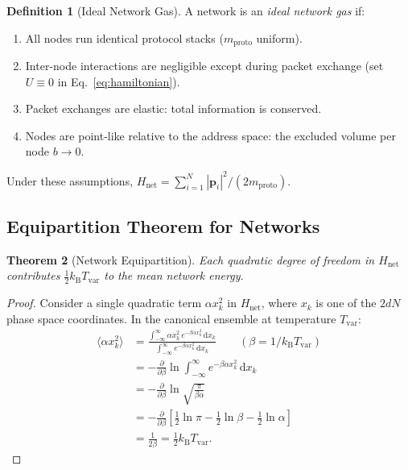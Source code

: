 \documentclass[11pt,twocolumn,a4paper]{article}
\newtheorem{theorem}{Theorem}[section]
\theoremstyle{definition}
\newtheorem{definition}[theorem]{Definition}
\theoremstyle{remark}
\newcommand{\kB}{k_{\mathrm{B}}}
\newcommand{\Tvar}{T_{\mathrm{var}}}
\newcommand{\mpr}{m_{\mathrm{proto}}}
\newcommand{\Hnet}{H_{\mathrm{net}}}
\newcommand{\dd}{\mathrm{d}}
\newcommand{\avg}[1]{\langle #1 \rangle}
\newcommand{\pder}[2]{\frac{\partial #1}{\partial #2}}
\begin{document}
\begin{definition}[Ideal Network Gas]\label{def:ideal_gas}
A network is an \emph{ideal network gas} if:
\begin{enumerate}[label=(\roman*)]
  \item All nodes run identical protocol stacks ($\mpr$ uniform).
  \item Inter-node interactions are negligible except during packet exchange
        (set $U\equiv 0$ in Eq.~\eqref{eq:hamiltonian}).
  \item Packet exchanges are elastic: total information is conserved.
  \item Nodes are point-like relative to the address space:
        the excluded volume per node $b\to 0$.
\end{enumerate}
\end{definition}

Under these assumptions, $\Hnet=\sum_{i=1}^{N}|\bm{p}_i|^2/(2\mpr)$.

\subsection{Equipartition Theorem for Networks}\label{sec:equipartition}

\begin{theorem}[Network Equipartition]\label{thm:equipartition}
Each quadratic degree of freedom in $\Hnet$ contributes $\frac{1}{2}\kB\Tvar$
to the mean network energy.
\end{theorem}

\begin{proof}
Consider a single quadratic term $\alpha x_k^2$ in $\Hnet$, where $x_k$ is
one of the $2dN$ phase space coordinates.  In the canonical ensemble at
temperature $\Tvar$:
\begin{align}
  \avg{\alpha x_k^2}
  &= \frac{\displaystyle\int_{-\infty}^{\infty}\alpha x_k^2\,
     e^{-\beta\alpha x_k^2}\,\dd x_k}
     {\displaystyle\int_{-\infty}^{\infty}
     e^{-\beta\alpha x_k^2}\,\dd x_k}
  \qquad(\beta=1/\kB\Tvar) \nonumber\\
  &= -\pder{}{\beta}\ln\int_{-\infty}^{\infty}
     e^{-\beta\alpha x_k^2}\,\dd x_k \nonumber\\
  &= -\pder{}{\beta}\ln\sqrt{\frac{\pi}{\beta\alpha}} \nonumber\\
  &= -\pder{}{\beta}\left[\frac{1}{2}\ln\pi
     -\frac{1}{2}\ln\beta-\frac{1}{2}\ln\alpha\right] \nonumber\\
  &= \frac{1}{2\beta} = \frac{1}{2}\kB\Tvar. \label{eq:equipartition_proof}
\end{align}
\end{proof}
\end{document}
